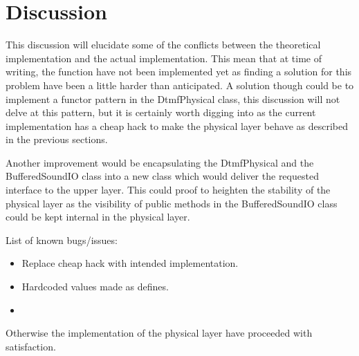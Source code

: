 \section{Discussion}
This discussion will elucidate some of the conflicts between the theoretical implementation and the actual implementation. This mean that at time of writing, the  function have not been implemented yet as finding a solution for this problem have been a little harder than anticipated. A solution though could be to implement a functor pattern in the DtmfPhysical class, this discussion will not delve at this pattern, but it is certainly worth digging into as the current implementation has a cheap hack to make the physical layer behave as described in the previous sections.

Another improvement would be encapsulating the DtmfPhysical and the BufferedSoundIO class into a new class which would deliver the requested interface to the upper layer. This could proof to heighten the stability of the physical layer as the visibility of public methods in the BufferedSoundIO class could be kept internal in the physical layer.

List of known bugs/issues:
\begin{itemize}
\item Replace cheap hack with intended implementation.
\item Hardcoded values made as defines.
\item 
\end{itemize}

Otherwise the implementation of the physical layer have proceeded with satisfaction.